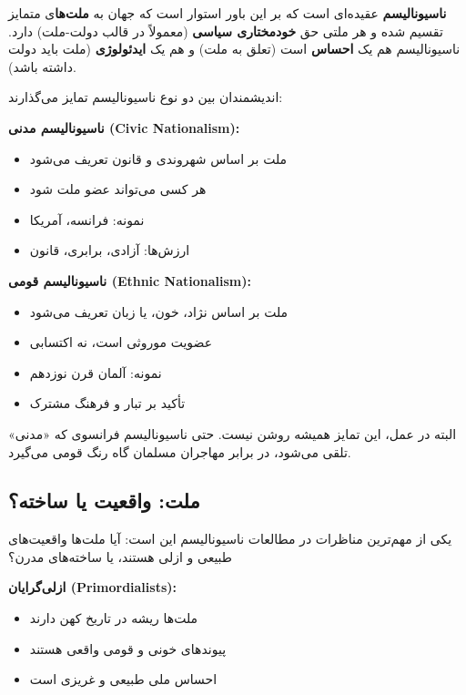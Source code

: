 \begin{tcolorbox}[
    enhanced,
    colback=rightblue!8,
    colframe=rightblue,
    boxrule=1.5pt,
    arc=5pt,
    fonttitle=\bfseries,
    title={\rl{🔵 تعریف کلیدی: ناسیونالیسم}}
]
\textbf{ناسیونالیسم} عقیده‌ای است که بر این باور استوار است که جهان به \textbf{ملت‌ها}ی متمایز تقسیم شده و هر ملتی حق \textbf{خودمختاری سیاسی} (معمولاً در قالب دولت-ملت) دارد. ناسیونالیسم هم یک \textbf{احساس} است (تعلق به ملت) و هم یک \textbf{ایدئولوژی} (ملت باید دولت داشته باشد).
\end{tcolorbox}


اندیشمندان بین دو نوع ناسیونالیسم تمایز می‌گذارند:

\textbf{ناسیونالیسم مدنی (Civic Nationalism):}
\begin{itemize}
    \item ملت بر اساس شهروندی و قانون تعریف می‌شود
    \item هر کسی می‌تواند عضو ملت شود
    \item نمونه: فرانسه، آمریکا
    \item ارزش‌ها: آزادی، برابری، قانون
\end{itemize}

\textbf{ناسیونالیسم قومی (Ethnic Nationalism):}
\begin{itemize}
    \item ملت بر اساس نژاد، خون، یا زبان تعریف می‌شود
    \item عضویت موروثی است، نه اکتسابی
    \item نمونه: آلمان قرن نوزدهم
    \item تأکید بر تبار و فرهنگ مشترک
\end{itemize}

البته در عمل، این تمایز همیشه روشن نیست. حتی ناسیونالیسم فرانسوی که «مدنی» تلقی می‌شود، در برابر مهاجران مسلمان گاه رنگ قومی می‌گیرد.


\subsection{ملت: واقعیت یا ساخته؟}


یکی از مهم‌ترین مناظرات در مطالعات ناسیونالیسم این است: آیا ملت‌ها واقعیت‌های طبیعی و ازلی هستند، یا ساخته‌های مدرن؟

\textbf{ازلی‌گرایان (Primordialists):}
\begin{itemize}
    \item ملت‌ها ریشه در تاریخ کهن دارند
    \item پیوندهای خونی و قومی واقعی هستند
    \item احساس ملی طبیعی و غریزی است
\end{itemize}

